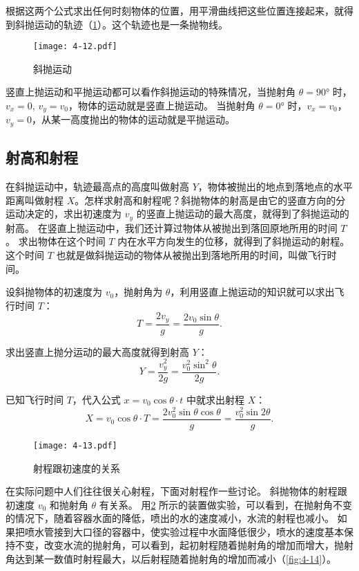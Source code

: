 根据这两个公式求出任何时刻物体的位置，用平滑曲线把这些位置连接起来，就得到斜抛运动的轨迹（\cref{fig:4-12}）。这个轨迹也是一条抛物线。

\begin{figure}
  \texttt{[image: 4-12.pdf]}
  \caption{斜抛运动}\label{fig:4-12}
\end{figure}

竖直上抛运动和平抛运动都可以看作斜抛运动的特殊情况，当抛射角 $\theta=\ang{90}$ 时，$v_x=0$, $v_y=v_0$，物体的运动就是竖直上抛运动。
当抛射角 $\theta =\ang{0}$ 时，$v_x=v_0$，$v_y=0$，从某一高度抛出的物体的运动就是平抛运动。

\subsection{射高和射程} 

在斜抛运动中，轨迹最高点的高度叫做射高 $Y$，物体被抛出的地点到落地点的水平距离叫做射程 $X$。怎样求射高和射程呢？斜抛物体的射高是由它的竖直方向的分运动决定的，求出初速度为 $v_y$ 的竖直上抛运动的最大高度，就得到了斜抛运动的射高。
在竖直上抛运动中，我们还计算过物体从被抛出到落回原地所用的时间 $T$。
求出物体在这个时间 $T$ 内在水平方向发生的位移，就得到了斜抛运动的射程。
这个时间 $T$ 也就是做斜抛运动的物体从被抛出到落地所用的时间，叫做飞行时间。

设斜抛物体的初速度为 $v_0$，抛射角为 $\theta$，利用竖直上抛运动的知识就可以求出飞行时间 $T$：
\[T=\frac{2v_y}{g}=\frac{2v_0\sin\theta}{g}.\]

求出竖直上抛分运动的最大高度就得到射高 $Y$：
\[Y=\frac{v^2_y}{2g}=\frac{v_0^2\sin^2\theta}{2g}.\]

已知飞行时间 $T$，代入公式 $x=v_0\cos\theta \cdot t$ 中就求出射程 $X$：
\[X=v_0\cos\theta \cdot T=\frac{2v_0^2\sin\theta \cos\theta}{g}=\frac{v_0^2\sin 2\theta}{g}.\]

\begin{figure}
  \texttt{[image: 4-13.pdf]}
  \caption{射程跟初速度的关系}\label{fig:4-13}
\end{figure}

在实际问题中人们往往很关心射程，下面对射程作一些讨论。
斜抛物体的射程跟初速度 $v_0$ 和抛射角 $\theta$ 有关系。
用\cref{fig:4-13} 所示的装置做实验，可以看到，在抛射角不变的情况下，随着容器水面的降低，喷出的水的速度减小，水流的射程也减小。
如果把喷水管接到大口径的容器中，使实验过程中水面降低很少，喷水的速度基本保持不变，改变水流的抛射角，可以看到，起初射程随着抛射角的增加而增大，抛射角达到某一数值时射程最大，以后射程随着抛射角的增加而减小（\cref{fig:4-14}）。

